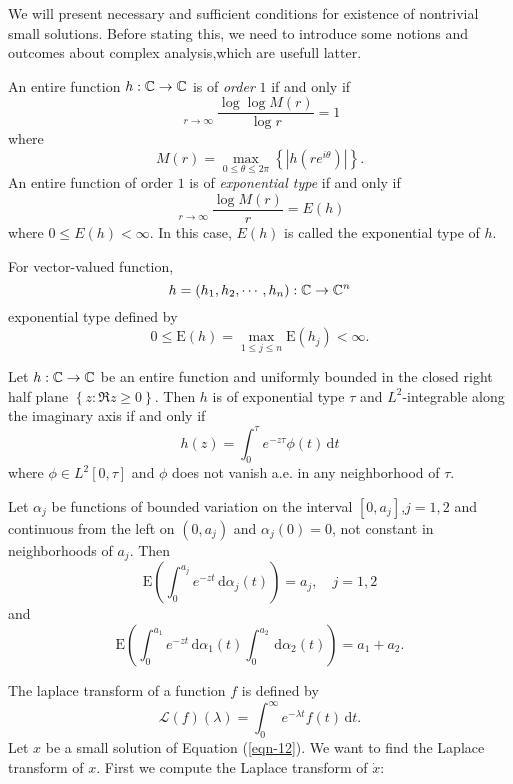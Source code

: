 We will present necessary and sufficient conditions for existence of nontrivial small solutions. Before stating this, we need to introduce some notions and outcomes about complex analysis,which are usefull latter.

\begin{definition}
  An entire function $h:\mathbb{C}\to \mathbb{C}$ is of \textit{order} $1$ if and only if
  \[
 \mathop{\overline{\lim}}\limits_{r\to \infty} \frac{\log \log M(r)}{\log r}=1
  \] 
  where
  \[
    M(r)=\max_{0\le\theta\le 2\pi}\left\{ |h(re^{i\theta})|\right\} .
  \] 
  An entire function of order $1$ is of \textit{exponential type} if and only if
  \[
    \mathop{\overline{\lim}}\limits_{r\to \infty} \frac{\log M(r)}{r}=E(h)
  \] 
  where $0\le E(h)<\infty$.
  In this case, $E(h)$ is called the exponential type of $h$.
\end{definition}
For vector-valued function,
\[
  h=(h_1,h_2,\cdots,h_n):\mathbb{C}\to \mathbb{C}^{n}
\] 
exponential type defined by 
\[
  0\le \mathrm{E}(h)=\max_{1\le j\le n}\mathrm{E}(h_j)<\infty.
\] 

\begin{lemma}\label{lma-4-3}
  Let $h:\mathbb{C}\to \mathbb{C}$ be an entire function and uniformly bounded in the closed right half plane $\left\{z:\Re z\ge 0\right\} $. Then $h$ is of exponential type $\tau $ and $L^2$-integrable along the imaginary axis if and only if 
  \[
    h(z)=\int_0^{\tau }e^{-z\tau }\phi(t) \,\mathrm{d}t
  \] 
  where $\phi \in L^2[0,\tau ]$ and $\phi$ does not vanish a.e. in any neighborhood of $\tau $.
\end{lemma}

\begin{lemma}
  Let $\alpha_j$ be functions of bounded variation on the interval $[0,a_j]$,$j=1,2$ and continuous from the left on $(0,a_j)$ and $\alpha_j(0)=0$, not constant in neighborhoods of $a_j$. Then 
   \begin{equation}
     \mathrm{E}(\int_{0}^{a_j}e^{-zt}\,\mathrm{d}\alpha_j(t))=a_j,\quad j=1,2
  \end{equation}
  and 
  \begin{equation}
    \mathrm{E}(\int_0^{a_1}e^{-zt}\,\mathrm{d}\alpha_1(t)\int_{0}^{a_2}\,\mathrm{d}\alpha_2(t))=a_1+a_2.
  \end{equation}
\end{lemma}
The laplace transform of a function  $f$ is defined by 
\[
  \mathcal{L}(f)(\lambda)=\int_0^{\infty}e^{-\lambda t}f(t)\,\mathrm{d}t.
\] 
Let $x$ be a small solution of Equation (\ref{eqn-12}). We want to find the Laplace transform of $x$. First we compute the Laplace transform of  $\dot{x}$:

